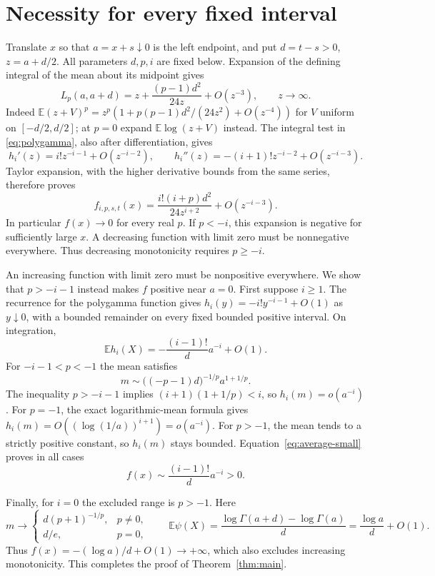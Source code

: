 \documentclass[11pt]{article}
\newcommand{\E}{\mathbb E}
\begin{document}
\section*{Necessity for every fixed interval}
Translate $x$ so that $a=x+s\downarrow0$ is the left endpoint,
and put $d=t-s>0$, $z=a+d/2$. All parameters $d,p,i$ are fixed below.
Expansion of the defining integral of the mean about its midpoint gives
\begin{equation}\label{eq:mean-asymptotic}
L_p(a,a+d)=z+\frac{(p-1)d^2}{24z}+O(z^{-3}),
\qquad z\to\infty.
\end{equation}
Indeed $\E(z+V)^p=z^p(1+p(p-1)d^2/(24z^2)+O(z^{-4}))$
for $V$ uniform on $[-d/2,d/2]$; at $p=0$ expand
$\E\log(z+V)$ instead.
The integral test in \eqref{eq:polygamma}, also after differentiation,
gives
\[
h_i'(z)=i!z^{-i-1}+O(z^{-i-2}),\qquad
h_i''(z)=-(i+1)!z^{-i-2}+O(z^{-i-3}).
\]
Taylor expansion, with the higher derivative bounds from the same
series, therefore proves
\begin{equation}\label{eq:f-infinity}
f_{i,p,s,t}(x)=\frac{i!(i+p)d^2}{24z^{i+2}}
                  +O(z^{-i-3}).
\end{equation}
In particular $f(x)\to0$ for every real $p$.
If $p<-i$, this expansion is negative for sufficiently large $x$.
A decreasing function with limit zero must be nonnegative everywhere.
Thus decreasing monotonicity requires $p\ge-i$.

An increasing function with limit zero must be nonpositive everywhere.
We show that $p>-i-1$ instead makes $f$ positive near $a=0$.
First suppose $i\ge1$. The recurrence for the polygamma function gives
$h_i(y)=-i!y^{-i-1}+O(1)$ as $y\downarrow0$, with a bounded
remainder on every fixed bounded positive interval. On integration,
\begin{equation}\label{eq:average-small}
\E h_i(X)=-\frac{(i-1)!}{d}a^{-i}+O(1).
\end{equation}
For $-i-1<p<-1$ the mean satisfies
\[
m\sim\bigl((-p-1)d\bigr)^{-1/p}a^{1+1/p}.
\]
The inequality $p>-i-1$ implies $(i+1)(1+1/p)<i$, so
$h_i(m)=o(a^{-i})$. For $p=-1$, the exact logarithmic-mean formula
gives $h_i(m)=O((\log(1/a))^{i+1})=o(a^{-i})$.
For $p>-1$, the mean tends to a strictly positive constant, so $h_i(m)$
stays bounded. Equation~\eqref{eq:average-small} proves in all cases
\[
f(x)\sim\frac{(i-1)!}{d}a^{-i}>0.
\]

Finally, for $i=0$ the excluded range is $p>-1$. Here
\[
m\longrightarrow
\begin{cases}d(p+1)^{-1/p},&p\ne0,\\d/e,&p=0,
\end{cases}
\qquad
\E\psi(X)=\frac{\log\Gamma(a+d)-\log\Gamma(a)}d
            =\frac{\log a}{d}+O(1).
\]
Thus $f(x)=-(\log a)/d+O(1)\to+\infty$, which also excludes increasing
monotonicity. This completes the proof of Theorem~\ref{thm:main}.
\end{document}
